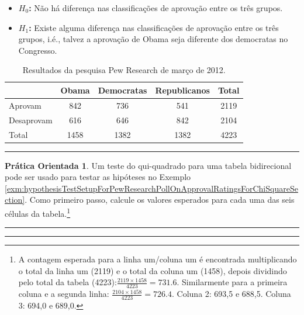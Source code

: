 \documentclass[
]{book}
\providecommand{\tightlist}{%
  \setlength{\itemsep}{0pt}\setlength{\parskip}{0pt}}
\theoremstyle{definition}
\theoremstyle{definition}
\theoremstyle{definition}
\newtheorem{exercise}{Prática Orientada}[chapter]
\theoremstyle{definition}
\theoremstyle{remark}
\begin{document}
\begin{itemize}
\tightlist
\item
  \textbf{\(H_0\):} Não há diferença nas classificações de aprovação entre os três grupos.
\item
  \textbf{\(H_1\):} Existe alguma diferença nas classificações de aprovação entre os três grupos, i.é., talvez a aprovação de Obama seja diferente dos democratas no Congresso.
\end{itemize}

\begin{table}

\caption{\label{tab:pewResearchPollOnApprovalRatingsForChiSquareSectionExampleAndExercises}Resultados da pesquisa Pew Research de março de 2012.}
\centering
\begin{tabular}[t]{l|c|c|c|c}
\hline
  & Obama & Democratas & Republicanos & Total\\
\hline
Aprovam & 842 & 736 & 541 & 2119\\
\hline
Desaprovam & 616 & 646 & 842 & 2104\\
\hline
Total & 1458 & 1382 & 1382 & 4223\\
\hline
\end{tabular}
\end{table}

\begin{center}\rule{0.5\linewidth}{0.5pt}\end{center}

\begin{exercise}
\protect\hypertarget{exr:unnamed-chunk-253}{}{\label{exr:unnamed-chunk-253} }Um teste do qui-quadrado para uma tabela bidirecional pode ser usado para testar as hipóteses no Exemplo \ref{exm:hypothesisTestSetupForPewResearchPollOnApprovalRatingsForChiSquareSection}. Como primeiro passo, calcule os valores esperados para cada uma das seis células da tabela.\footnote{A contagem esperada para a linha um/coluna um é encontrada multiplicando o total da linha um (2119) e o total da coluna um (1458), depois dividindo pelo total da tabela (4223):\(\frac{2119\times 1458}{4223} = 731.6\). Similarmente para a primeira coluna e a segunda linha: \(\frac{2104\times 1458}{4223} = 726.4\). Coluna 2: 693,5 e 688,5. Coluna 3: 694,0 e 689,0.}
\end{exercise}

\begin{center}\rule{0.5\linewidth}{0.5pt}\end{center}

\begin{center}\rule{0.5\linewidth}{0.5pt}\end{center}
\end{document}
